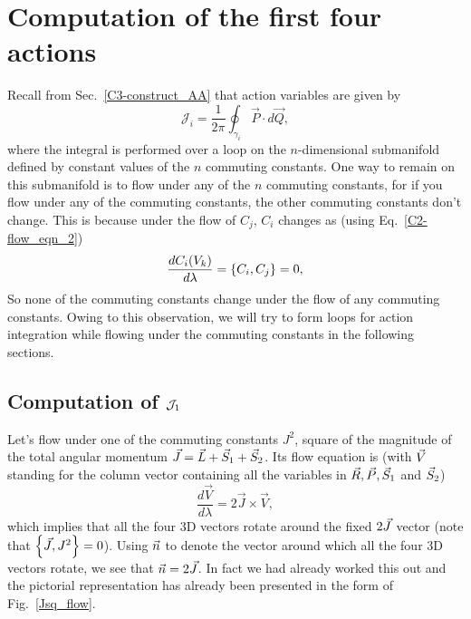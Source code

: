 \chapter{Computation of the first four actions}    \label{chapter-5}





Recall from Sec.~\ref{C3-construct_AA} that action variables are given by
\begin{equation}
\mathcal{J}_{i}=\frac{1}{2 \pi} \oint_{\gamma_{i}} \vec{P} \cdot d \vec{Q} , 
\end{equation}
where the integral is performed over  a loop on the $n$-dimensional 
submanifold defined by constant values of the $n$ commuting constants.
One way to remain on this submanifold is to flow under any of the 
$n$ commuting constants, for if you flow under any of the commuting 
constants, the other commuting constants don't change. This is because
under the flow of $C_j$, $C_i$ changes as (using Eq.~\eqref{C2-flow_eqn_2})
\begin{align}
\frac{d C_i(V_k)}{d \lambda}   = \left\lbrace C_i, C_j \right\rbrace   = 0   ,
\end{align}
 So none of the commuting constants change under the flow
 of any commuting constants.
Owing to this observation, we will try to
form loops for action integration while flowing 
under the commuting constants in the following sections.



\section{Computation of $\mathcal{J}_1$}    \label{result_first_action}



Let's flow under one of the commuting constants $J^2$, square of the 
magnitude of the total angular momentum $\vec{J} = \vec{L} + \vec{S}_1 + \vec{S}_2$.
Its flow equation is (with $\vec{V}$ standing for 
the column vector containing all the variables in $\vec{R}, \vec{P}, \vec{S}_1$
and $\vec{S}_2$)
\begin{equation}
\frac{d \vec{V}}{d \lambda} = 2 \vec{J} \times \vec{V},      \label{flow_action_1}
\end{equation}
which implies that all the four 3D vectors rotate around 
the fixed $2 \vec{J}$ vector (note that $\left\lbrace \vec{J}, J^2 \right\rbrace = 0$).
Using $\vec{n}$ to denote the vector around which all the four
3D vectors rotate, we see that $\vec{n} = 2 \vec{J} $.
In fact we had already worked this out and the pictorial 
representation has already been presented in the form 
of Fig.~\ref{Jsq_flow}.



